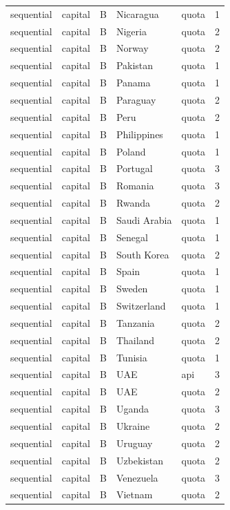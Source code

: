 \begin{tabular}{lllllr}
sequential & capital & B & Nicaragua & quota & 1 \\
sequential & capital & B & Nigeria & quota & 2 \\
sequential & capital & B & Norway & quota & 2 \\
sequential & capital & B & Pakistan & quota & 1 \\
sequential & capital & B & Panama & quota & 1 \\
sequential & capital & B & Paraguay & quota & 2 \\
sequential & capital & B & Peru & quota & 2 \\
sequential & capital & B & Philippines & quota & 1 \\
sequential & capital & B & Poland & quota & 1 \\
sequential & capital & B & Portugal & quota & 3 \\
sequential & capital & B & Romania & quota & 3 \\
sequential & capital & B & Rwanda & quota & 2 \\
sequential & capital & B & Saudi Arabia & quota & 1 \\
sequential & capital & B & Senegal & quota & 1 \\
sequential & capital & B & South Korea & quota & 2 \\
sequential & capital & B & Spain & quota & 1 \\
sequential & capital & B & Sweden & quota & 1 \\
sequential & capital & B & Switzerland & quota & 1 \\
sequential & capital & B & Tanzania & quota & 2 \\
sequential & capital & B & Thailand & quota & 2 \\
sequential & capital & B & Tunisia & quota & 1 \\
sequential & capital & B & UAE & api & 3 \\
sequential & capital & B & UAE & quota & 2 \\
sequential & capital & B & Uganda & quota & 3 \\
sequential & capital & B & Ukraine & quota & 2 \\
sequential & capital & B & Uruguay & quota & 2 \\
sequential & capital & B & Uzbekistan & quota & 2 \\
sequential & capital & B & Venezuela & quota & 3 \\
sequential & capital & B & Vietnam & quota & 2 \\

\end{tabular}
